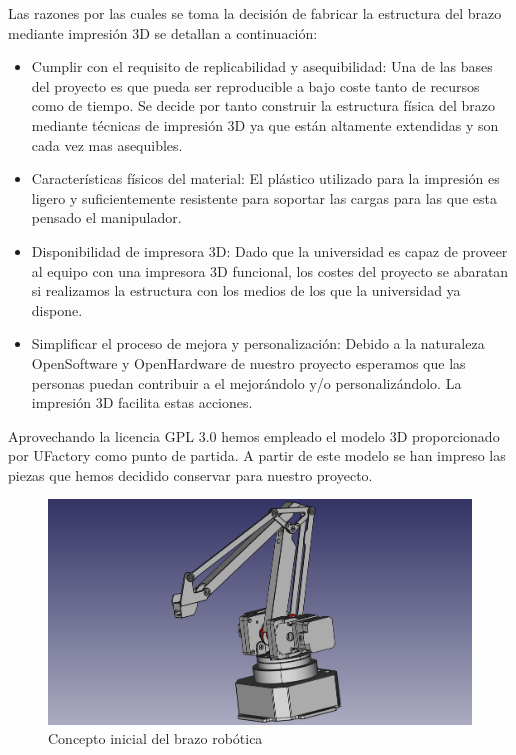 Las razones por las cuales se toma la decisión de fabricar la estructura del brazo mediante impresión 3D se detallan a continuación:

\begin{itemize}
  \item Cumplir con el requisito de replicabilidad y asequibilidad: Una de las bases del proyecto es que pueda ser reproducible a bajo coste tanto de recursos como de tiempo. Se decide por tanto construir la estructura física del brazo mediante técnicas de impresión 3D ya que están altamente extendidas y son cada vez mas asequibles.
  
  \item Características físicos del material: El plástico utilizado para la impresión es ligero y suficientemente resistente para soportar las cargas para las que esta pensado el manipulador.
  
  \item Disponibilidad de impresora 3D: Dado que la universidad es capaz de proveer al equipo con una impresora 3D funcional, los costes del proyecto se abaratan si realizamos la estructura con los medios de los que la universidad ya dispone.
  
  \item Simplificar el proceso de mejora y personalización: Debido a la naturaleza OpenSoftware y OpenHardware de nuestro proyecto esperamos que las personas puedan contribuir a el mejorándolo y/o personalizándolo. La impresión 3D facilita estas acciones.
\end{itemize}

Aprovechando la licencia GPL 3.0 hemos empleado el modelo 3D proporcionado por UFactory como punto de partida. A partir de este modelo se han impreso las piezas que hemos decidido conservar para nuestro proyecto.

\begin{figure}[H]
    \centering
    \includegraphics[width=12cm]{imagenes/brazo_vista_3d_inicial.png}
    \caption{Concepto inicial del brazo robótica}
    \label{fig:manipulador_inicial}
\end{figure}

